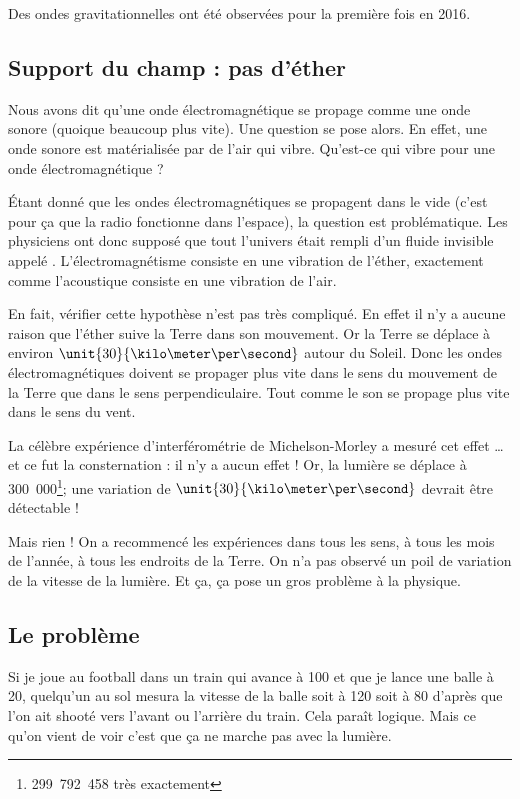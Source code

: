 Des ondes gravitationnelles ont été observées pour la première fois en 2016\cite{BIBooAZZPooQvHWLV}.


\subsection{Support du champ : pas d'éther}

Nous avons dit qu'une onde électromagnétique se propage comme une onde sonore (quoique beaucoup plus vite). Une question se pose alors. En effet, une onde sonore est matérialisée par de l'air qui vibre. Qu'est-ce qui vibre pour une onde électromagnétique ?

Étant donné que les ondes électromagnétiques se propagent dans le vide (c'est pour ça que la radio fonctionne dans l'espace), la question est problématique. Les physiciens ont donc supposé que tout l'univers était rempli d'un fluide invisible appelé . L'électromagnétisme consiste en une vibration de l'éther, exactement comme l'acoustique consiste en une vibration de l'air.

En fait, vérifier cette hypothèse n'est pas très compliqué. En effet il n'y a aucune raison que l'éther suive la Terre dans son mouvement. Or la Terre se déplace à environ \( \unit{30}{\kilo\meter\per\second}\) autour du Soleil. Donc les ondes électromagnétiques doivent se propager plus vite dans le sens du mouvement de la Terre que dans le sens perpendiculaire. Tout comme le son se propage plus vite dans le sens du vent.

La célèbre expérience d'interférométrie de Michelson-Morley\cite{BIBooJSDSooIUhMQQ} a mesuré cet effet \ldots et ce fut la consternation : il n'y a aucun effet ! Or, la lumière se déplace à \unit{300.000}{\kilo\meter\per\second}\footnote{\unit{299.792.458}{\meter\per\second} très exactement}; une variation de \( \unit{30}{\kilo\meter\per\second}\) devrait être détectable !

Mais rien ! On a recommencé les expériences dans tous les sens, à tous les mois de l'année, à tous les endroits de la Terre. On n'a pas observé un poil de variation de la vitesse de la lumière. Et ça, ça pose un gros problème à la physique.


\subsection{Le problème}

Si je joue au football dans un train qui avance à \unit{100}{\kilo\meter\per\hour} et que je lance une balle à \unit{20}{\kilo\meter\per\hour}, quelqu'un au sol mesura la vitesse de la balle soit à \unit{120}{\kilo\meter\per\hour} soit à \unit{80}{\kilo\meter\per\hour} d'après que l'on ait shooté vers l'avant ou l'arrière du train. Cela paraît logique. Mais ce qu'on vient de voir c'est que ça ne marche pas avec la lumière.

